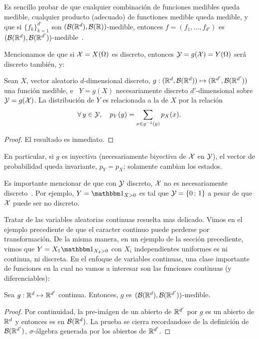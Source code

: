 Es sencillo  probar de que  cualquier combinaci\'on de funciones  medibles queda
medible, cualquier  producto (adecuado) de  functiones medible queda  medible, y
que si $\{ f_k \}_{k=1}^{d'}$ son $(\mathcal{B}(\mathbb{R}^d),\mathcal{B}(\mathbb{R}))$-medible, entonces $f
=          (f_1         ,          \ldots         ,          f_{d'})$         es
$(\mathcal{B}(\mathbb{R}^d),\mathcal{B}(\mathbb{R}^{d'}))$-medible~\cite{AthLah06}.



Mencionamos  de que si  $\mathcal{X} =  X(\Omega)$ es  discreto, entonces  $\mathcal{Y} =  g(\mathcal{X}) =
Y(\Omega)$ ser\'a discreto tambi\'en, y:
%
\begin{teorema}
  Sean   $X$,   vector  aleatorio   $d$-dimensional   discreto,  $g:(\mathbb{R}^d   ,
  \mathcal{B}(\mathbb{R}^d)) \mapsto (\mathbb{R}^{d'} , \mathcal{B}(\mathbb{R}^{d'}))$ una funci\'on medible, e \
  $Y =  g(X)$ necesariamente discreto  $d'$-dimensional sobre $\mathcal{Y} =  g(\mathcal{X})$.  La
  distribuci\'on de $Y$ es relacionada a la de $X$ por la relaci\'on
  \[
  \forall \, y \in \mathcal{Y}, \quad p_Y(y) = \sum_{x \in g^{-1}(y)} p_X(x).
  \]
\end{teorema}
%
\begin{proof}
El resultado es inmediato.
\end{proof}
%
\noindent En particular,  si $g$ es inyectiva (necesariamente  biyectiva de $\mathcal{X}$
en $\mathcal{Y}$),  el vector  de probabilidad queda  invariante, $p_Y =  p_X$; solamente
cambian los estados.

Es  importante mencionar de  que con  $\mathcal{Y}$ discreto,  $\mathcal{X}$ no  es necesariamente
discreto~\cite{AthLah06}. Por ejemplo, $Y = \un_{X>0}$  es tal que $\mathcal{Y} = \{ 0 \,
; \, 1 \}$ a pesar de que $\mathcal{X}$ puede ser no discreto.

Tratar de las variables aleatorias  continuas resuelta mas delicado. Vimos en el
ejemplo   precediente  de   que  el   caracter  continuo   puede   perderse  por
transformaci\'on. De la misma manera, en un ejemplo de la secci\'on precediente,
vimos  que  $Y =  X_1  \un_{X_2>0}$ con  $X_i$  independientes  uniformes es  ni
continua,  ni  discreta.  En  el  enfoque  de  variables  continuas,  una  clase
importante  de funciones  en la  cual  no vamos  a interesar  son las  funciones
continuas (y diferenciables):
%
\begin{lema}
  Sea   $g:   \mathbb{R}^d   \mapsto   \mathbb{R}^{d'}$   continua.   Entonces,   $g$   es
  $(\mathcal{B}(\mathbb{R}^d),\mathcal{B}(\mathbb{R}^{d'}))$-medible.
\end{lema}
%
\begin{proof}
  Por continuidad,  la pre-im\'agen de  un abierto de  $\mathbb{R}^{d'}$ por $g$  es un
  abierto  de $\mathbb{R}^d$  y entonces  es en  $\mathcal{B}(\mathbb{R}^d)$. La  prueba  se cierra
  recordandose  de  la   definici\'on  de  $\mathcal{B}(\mathbb{R}^{d'})$,  $\sigma$-\'algebra
  generada por los abiertos de $\mathbb{R}^{d'}$.
\end{proof}

